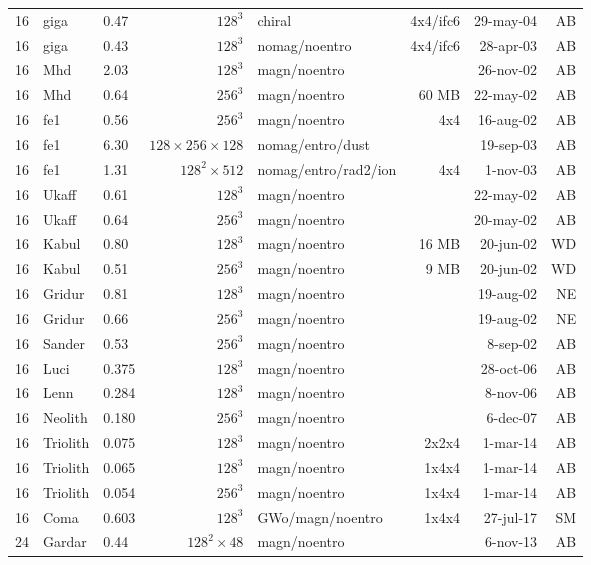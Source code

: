 \documentclass[\mydriver,12pt,twoside,notitlepage,a4paper]{article}
\begin{document}
\begin{center}
\begin{footnotesize}
\begin{longtable}{rllrlrrr}
  16 & giga  & 0.47 & $128^3$ & chiral       &4x4/ifc6& 29-may-04 & AB \\
  16 & giga  & 0.43 & $128^3$ & nomag/noentro&4x4/ifc6& 28-apr-03 & AB \\
  16 & Mhd   & 2.03 & $128^3$ & magn/noentro &        & 26-nov-02 & AB \\
  16 & Mhd   & 0.64 & $256^3$ & magn/noentro &  60 MB & 22-may-02 & AB \\
  16 & fe1   & 0.56 & $256^3$ & magn/noentro &  4x4   & 16-aug-02 & AB \\
  16 & fe1   & 6.30 & $128{\!\times\!}256{\!\times\!}128$
                              & nomag/entro/dust &    & 19-sep-03 & AB \\
  16 & fe1   & 1.31 & $128^2{\!\times\!}512$
                     & nomag/entro/rad2/ion &  4x4   &  1-nov-03 & AB \\
  16 & Ukaff & 0.61 & $128^3$ & magn/noentro &        & 22-may-02 & AB \\
  16 & Ukaff & 0.64 & $256^3$ & magn/noentro &        & 20-may-02 & AB \\
  16 & Kabul & 0.80 & $128^3$ & magn/noentro &  16 MB & 20-jun-02 & WD \\
  16 & Kabul & 0.51 & $256^3$ & magn/noentro &   9 MB & 20-jun-02 & WD \\
  16 & Gridur& 0.81 & $128^3$ & magn/noentro &        & 19-aug-02 & NE \\
  16 & Gridur& 0.66 & $256^3$ & magn/noentro &        & 19-aug-02 & NE \\
  16 & Sander& 0.53 & $256^3$ & magn/noentro &        &  8-sep-02 & AB \\
  16 & Luci  & 0.375& $128^3$ & magn/noentro &        & 28-oct-06 & AB \\
  16 & Lenn  & 0.284& $128^3$ & magn/noentro &        &  8-nov-06 & AB \\
  16 &Neolith& 0.180& $256^3$ & magn/noentro &        &  6-dec-07 & AB \\
  16 &Triolith&0.075& $128^3$ & magn/noentro & 2x2x4  &  1-mar-14 & AB \\
  16 &Triolith&0.065& $128^3$ & magn/noentro & 1x4x4  &  1-mar-14 & AB \\
  16 &Triolith&0.054& $256^3$ & magn/noentro & 1x4x4  &  1-mar-14 & AB \\
  16 &Coma & 0.603 & $128^3$ & GWo/magn/noentro & 1x4x4  & 27-jul-17 & SM \\
  24 &Gardar & 0.44 & $128^2\times48$ & magn/noentro &        & 6-nov-13 & AB \\

\end{longtable}
\end{footnotesize}
\end{center}
\end{document}
